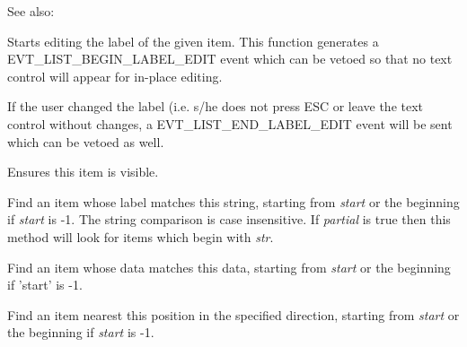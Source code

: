 See also: 


\label{wxlistctrledit}


Starts editing the label of the given item. This function generates a
EVT\_LIST\_BEGIN\_LABEL\_EDIT event which can be vetoed so that no
text control will appear for in-place editing.

If the user changed the label (i.e. s/he does not press ESC or leave
the text control without changes, a EVT\_LIST\_END\_LABEL\_EDIT event
will be sent which can be vetoed as well.


\label{wxlistctrlensurevisible}


Ensures this item is visible.


\label{wxlistctrlfinditem}


Find an item whose label matches this string, starting from {\it start} or
the beginning if {\it start} is -1. The string comparison is case
insensitive. If {\it partial} is true then this method will look for
items which begin with {\it str}.


Find an item whose data matches this data, starting from {\it start} or
the beginning if 'start' is -1.


Find an item nearest this position in the specified direction, starting from
{\it start} or the beginning if {\it start} is -1.




